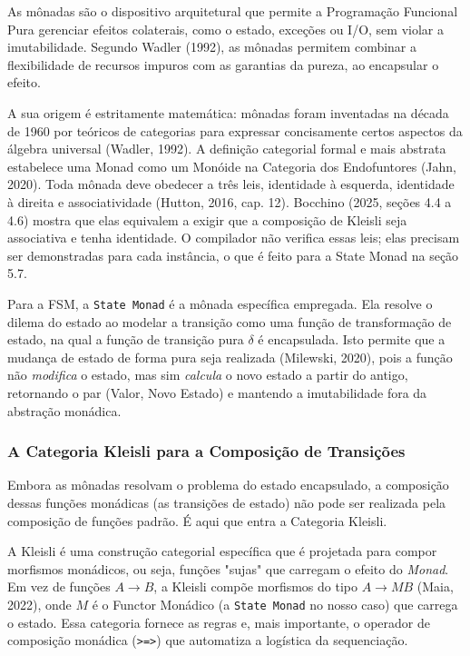 \documentclass[12pt,a4paper]{article}
\begin{document}
As mônadas são o dispositivo arquitetural que permite a Programação Funcional Pura gerenciar efeitos colaterais, como o estado, exceções ou I/O, sem violar a imutabilidade. Segundo Wadler (1992), as mônadas permitem combinar a flexibilidade de recursos impuros com as garantias da pureza, ao encapsular o efeito.

A sua origem é estritamente matemática: mônadas foram inventadas na década de 1960 por teóricos de categorias para expressar concisamente certos aspectos da álgebra universal (Wadler, 1992). A definição categorial formal e mais abstrata estabelece uma Monad como um Monóide na Categoria dos Endofuntores (Jahn, 2020). Toda mônada deve obedecer a três leis, identidade à esquerda, identidade à direita e associatividade (Hutton, 2016, cap. 12). Bocchino (2025, seções 4.4 a 4.6) mostra que elas equivalem a exigir que a composição de Kleisli seja associativa e tenha identidade. O compilador não verifica essas leis; elas precisam ser demonstradas para cada instância, o que é feito para a State Monad na seção 5.7.

Para a FSM, a \texttt{State Monad} é a mônada específica empregada. Ela resolve o dilema do estado ao modelar a transição como uma função de transformação de estado, na qual a função de transição pura $\delta$ é encapsulada. Isto permite que a mudança de estado de forma pura seja realizada (Milewski, 2020), pois a função não \textit{modifica} o estado, mas sim \textit{calcula} o novo estado a partir do antigo, retornando o par (Valor, Novo Estado) e mantendo a imutabilidade fora da abstração monádica.

\subsubsection{A Categoria Kleisli para a Composição de Transições}

Embora as mônadas resolvam o problema do estado encapsulado, a composição dessas funções monádicas (as transições de estado) não pode ser realizada pela composição de funções padrão. É aqui que entra a Categoria Kleisli.

A Kleisli é uma construção categorial específica que é projetada para compor morfismos monádicos, ou seja, funções "sujas" que carregam o efeito do \textit{Monad}. Em vez de funções $A \to B$, a Kleisli compõe morfismos do tipo $A \to MB$ (Maia, 2022), onde $M$ é o Functor Monádico (a \texttt{State Monad} no nosso caso) que carrega o estado. Essa categoria fornece as regras e, mais importante, o operador de composição monádica (\texttt{>=>}) que automatiza a logística da sequenciação.
\end{document}
